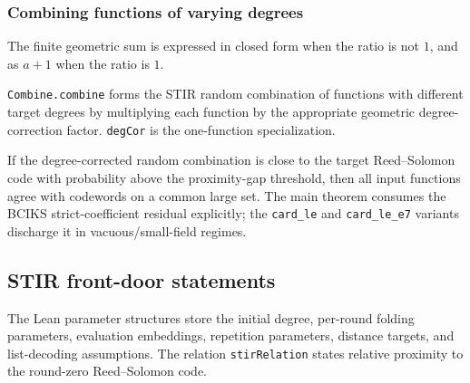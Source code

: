 \subsubsection{Combining functions of varying degrees}\label{sec:combine}

\begin{lemma}\label{fact:geometric_sum}
    The finite geometric sum is expressed in closed form when the ratio is not $1$, and as
    $a+1$ when the ratio is $1$.
\end{lemma}

\begin{definition}\label{def:combine}
    \texttt{Combine.combine} forms the STIR random combination of functions with different
    target degrees by multiplying each function by the appropriate geometric degree-correction
    factor.  \texttt{degCor} is the one-function specialization.
\end{definition}

\begin{lemma}\label{lemma:combine}
    If the degree-corrected random combination is close to the target Reed--Solomon code with
    probability above the proximity-gap threshold, then all input functions agree with
    codewords on a common large set.  The main theorem consumes the BCIKS strict-coefficient
    residual explicitly; the \texttt{card\_le} and \texttt{card\_le\_e7} variants discharge it
    in vacuous/small-field regimes.
\end{lemma}

\subsection{STIR front-door statements}\label{sec:stir_main_theorems}

\begin{definition}\label{def:stir_params}
    The Lean parameter structures store the initial degree, per-round folding parameters,
    evaluation embeddings, repetition parameters, distance targets, and list-decoding
    assumptions.  The relation \texttt{stirRelation} states relative proximity to the
    round-zero Reed--Solomon code.
\end{definition}

